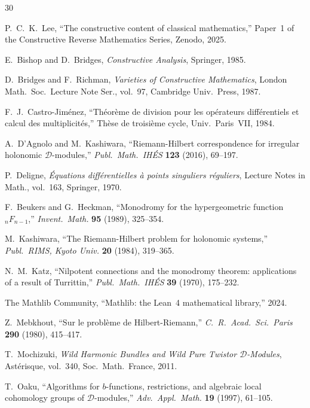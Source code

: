 \documentclass[11pt,a4paper]{article}
\theoremstyle{plain}
\theoremstyle{definition}
\begin{document}
\begin{thebibliography}{30}

P.~C.~K.~Lee, ``The constructive content of classical mathematics,'' Paper~1 of the Constructive Reverse Mathematics Series, Zenodo, 2025.

E.~Bishop and D.~Bridges, \textit{Constructive Analysis}, Springer, 1985.

D.~Bridges and F.~Richman, \textit{Varieties of Constructive Mathematics}, London Math.\ Soc.\ Lecture Note Ser., vol.~97, Cambridge Univ.\ Press, 1987.

F.~J.~Castro-Jim\'enez, ``Th\'eor\`eme de division pour les op\'erateurs diff\'erentiels et calcul des multiplicit\'es,'' Th\`ese de troisi\`eme cycle, Univ.\ Paris~VII, 1984.

A.~D'Agnolo and M.~Kashiwara, ``Riemann-Hilbert correspondence for irregular holonomic $\mathcal{D}$-modules,'' \textit{Publ.\ Math.\ IH\'ES} \textbf{123} (2016), 69--197.

P.~Deligne, \textit{\'Equations diff\'erentielles \`a points singuliers r\'eguliers}, Lecture Notes in Math., vol.~163, Springer, 1970.

F.~Beukers and G.~Heckman, ``Monodromy for the hypergeometric function ${}_nF_{n-1}$,'' \textit{Invent.\ Math.} \textbf{95} (1989), 325--354.

M.~Kashiwara, ``The Riemann-Hilbert problem for holonomic systems,'' \textit{Publ.\ RIMS, Kyoto Univ.} \textbf{20} (1984), 319--365.

N.~M.~Katz, ``Nilpotent connections and the monodromy theorem: applications of a result of Turrittin,'' \textit{Publ.\ Math.\ IH\'ES} \textbf{39} (1970), 175--232.

The Mathlib Community, ``Mathlib: the Lean~4 mathematical library,'' 2024.

Z.~Mebkhout, ``Sur le probl\`eme de Hilbert-Riemann,'' \textit{C.\ R.\ Acad.\ Sci.\ Paris} \textbf{290} (1980), 415--417.

T.~Mochizuki, \textit{Wild Harmonic Bundles and Wild Pure Twistor $\mathcal{D}$-Modules}, Ast\'erisque, vol.~340, Soc.\ Math.\ France, 2011.

T.~Oaku, ``Algorithms for $b$-functions, restrictions, and algebraic local cohomology groups of $\mathcal{D}$-modules,'' \textit{Adv.\ Appl.\ Math.} \textbf{19} (1997), 61--105.


\end{thebibliography}
\end{document}
